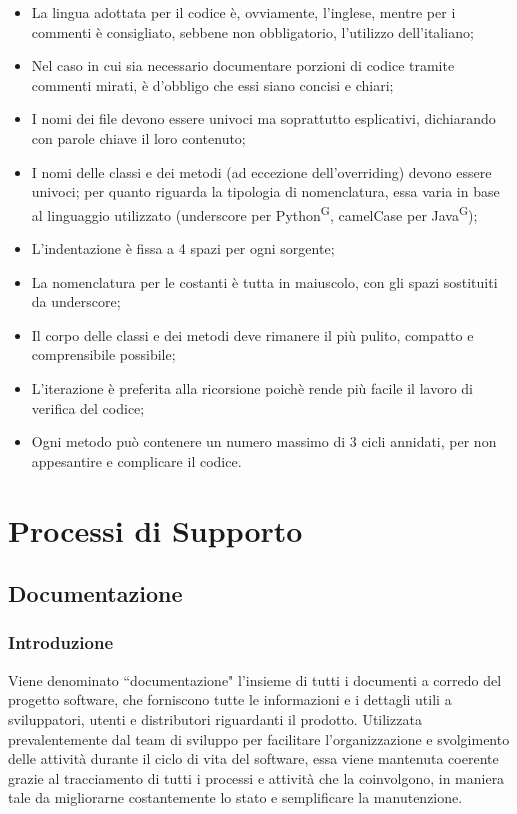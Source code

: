 \documentclass[8pt]{article}
\newcommand{\glossterm}[1]{#1\textsuperscript{G}} %
\begin{document}
\begin{itemize}
    \item La lingua adottata per il codice è, ovviamente, l'inglese, mentre per i commenti è consigliato, sebbene non obbligatorio, l'utilizzo dell'italiano;
    \item Nel caso in cui sia necessario documentare porzioni di codice tramite commenti mirati, è d'obbligo che essi siano concisi e chiari;
    \item I nomi dei file devono essere univoci ma soprattutto esplicativi, dichiarando con parole chiave il loro contenuto;
    \item I nomi delle classi e dei metodi (ad eccezione dell'overriding) devono essere univoci; per quanto riguarda la tipologia di nomenclatura, essa varia in base al linguaggio utilizzato (underscore per \glossterm{Python}, camelCase per \glossterm{Java});
    \item L'indentazione è fissa a 4 spazi per ogni sorgente;
    \item La nomenclatura per le costanti è tutta in maiuscolo, con gli spazi sostituiti da underscore;
    \item Il corpo delle classi e dei metodi deve rimanere il più pulito, compatto e comprensibile possibile;
    \item L'iterazione è preferita alla ricorsione poichè rende più facile il lavoro di verifica del codice;
    \item Ogni metodo può contenere un numero massimo di 3 cicli annidati, per non appesantire e complicare il codice.
\end{itemize}
\newpage
\section{Processi di Supporto} \label{sec:processi_supporto}
\subsection{Documentazione} \label{sec:doc}
\subsubsection{Introduzione}
Viene denominato ``documentazione" l'insieme di tutti i documenti a corredo del progetto software,
che forniscono tutte le informazioni e i dettagli utili a sviluppatori, utenti e distributori
riguardanti il prodotto. Utilizzata prevalentemente dal team di sviluppo per facilitare
l'organizzazione e svolgimento delle attività durante il ciclo di vita del software, essa viene
mantenuta coerente grazie al tracciamento di tutti i processi e attività che la coinvolgono, in maniera tale da migliorarne costantemente lo stato e semplificare la manutenzione.
\end{document}
